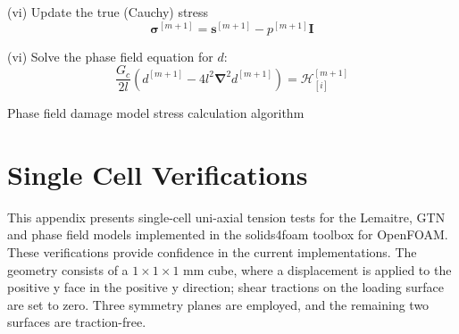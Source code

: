 \documentclass[sn-mathphys,Numbered]{sn-jnl}%
\newcommand{\bb}{\boldsymbol}
\begin{document}
\begin{appendices}
\begin{algorithm}[htbp]
(vi) Update the true (Cauchy) stress
\begin{equation}
	\boldsymbol{\sigma}^{[m+1]} = \boldsymbol{s}^{[m+1]} -  p^{[m+1]}\textbf{I} \nonumber
\end{equation}


(vi) Solve the phase field equation for $d$:
\begin{equation}
	\frac{G_c}{2l}\left(d^{[m+1]} -4l^2 \bb{\nabla}^2 d^{[m+1]} \right) =
	\mathcal{H}^{[m+1]}_{[i]} %
	 \nonumber
\end{equation}

\caption{Phase field damage model stress calculation algorithm}
\end{algorithm}










\section{Single Cell Verifications} \label{app:one_cell}
This appendix presents single-cell uni-axial tension tests for the Lemaitre, GTN and phase field models implemented in the solids4foam toolbox for OpenFOAM.
These verifications provide confidence in the current implementations.
The geometry consists of a $1\times1\times1$ mm cube, where a displacement is applied to the positive y face in the positive y direction; shear tractions on the loading surface are set to zero.
Three symmetry planes are employed, and the remaining two surfaces are traction-free.


\end{appendices}
\end{document}
